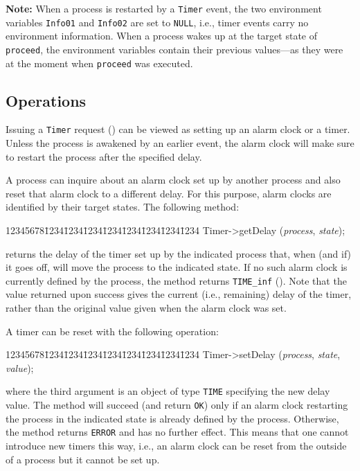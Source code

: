 \medskip

\noindent
{\bf Note:} When a process is restarted by a {\tt Timer} event, the
two environment variables {\tt Info01} and {\tt Info02} are set to
{\tt NULL}, i.e., timer events carry no environment information.
When a process wakes up at the target state of {\tt proceed}, the
environment variables contain their previous values---as they were at the
moment when {\tt proceed} was executed.

\subsection{Operations}
\label{rm_ti_op}

Issuing a {\tt Timer} request ()
can be viewed as setting up an alarm clock or a timer.
Unless the process is awakened by an earlier event, the alarm clock will make
sure to restart the process after the specified delay.

A process can inquire about an alarm clock set up by another process and
also reset that alarm clock to a different delay.
For this purpose, alarm clocks are identified by their target states.
The following method:
{\tt\begin{tabbing}
12345678\=1234\=1234\=1234\=1234\=1234\=1234\=1234\=1234\kill
\>Timer->getDelay ({\em process}, {\em state\/});
\end{tabbing}}
\noindent
returns the delay of the timer set up by the indicated process that,
when (and if) it goes off, will move the process to the indicated state.
If no such alarm clock is currently defined by the process, the method
returns {\tt TIME\_inf} ().
Note that the value returned upon success gives the current (i.e., remaining)
delay of the timer, rather than the original value given when the
alarm clock was set.

A timer can be reset with the following operation:
{\tt\begin{tabbing}
12345678\=1234\=1234\=1234\=1234\=1234\=1234\=1234\=1234\kill
\>Timer->setDelay ({\em process}, {\em state}, {\em value\/});
\end{tabbing}}
\noindent
where the third argument is an object of type {\tt TIME} specifying the
new delay value.
The method will succeed (and return {\tt OK}) only if an alarm clock restarting
the process in the indicated state is already defined by the process.
Otherwise, the method returns {\tt ERROR} and has no further effect.
This means that one cannot introduce new timers this way, i.e., an alarm clock
can be reset from the outside of a process but it cannot be set up.


